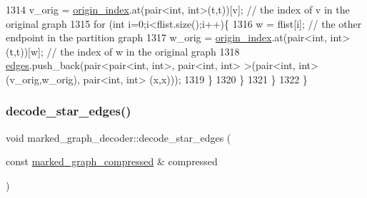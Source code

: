 \begin{DoxyCode}
1314       v\_orig = \hyperlink{classmarked__graph__decoder_aab3e2f6d4376ba96da32f25aa9ddd069}{origin\_index}.at(pair<int, int>(t,t))[v]; \textcolor{comment}{// the index of v in the original graph
       }
1315       \textcolor{keywordflow}{for} (\textcolor{keywordtype}{int} i=0;i<flist.size();i++)\{
1316         w = flist[i]; \textcolor{comment}{// the other endpoint in the partition graph}
1317         w\_orig = \hyperlink{classmarked__graph__decoder_aab3e2f6d4376ba96da32f25aa9ddd069}{origin\_index}.at(pair<int, int>(t,t))[w]; \textcolor{comment}{// the index of w in the original
       graph}
1318         \hyperlink{classmarked__graph__decoder_af9e75da0a495d9c3bdcd169e15e3261e}{edges}.push\_back(pair<pair<int, int>, pair<int, int> >(pair<int, int>(v\_orig,w\_orig), pair<int,
       int> (x,x)));
1319       \}
1320     \}
1321   \}
1322 \}
\end{DoxyCode}
\mbox{\label{classmarked__graph__decoder_a79fcfb8d5616c691114ebc0a7adb18b2}} 
\subsubsection{\texorpdfstring{decode\+\_\+star\+\_\+edges()}{decode\_star\_edges()}}
{\footnotesize\ttfamily void marked\+\_\+graph\+\_\+decoder\+::decode\+\_\+star\+\_\+edges (\begin{DoxyParamCaption}\item[{const \hyperlink{classmarked__graph__compressed}{marked\+\_\+graph\+\_\+compressed} \&}]{compressed }\end{DoxyParamCaption})\hspace{0.3cm}{\ttfamily [private]}}


